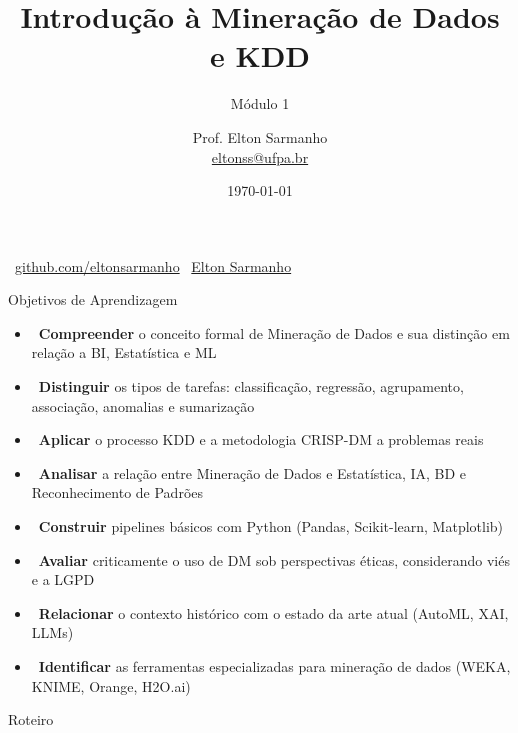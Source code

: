 \documentclass[aspectratio=169]{beamer}
\title[Mineração de Dados]{Introdução à Mineração de Dados e KDD}
\subtitle{Módulo 1}
\author[Elton Sarmanho]{
    Prof. Elton Sarmanho\inst{1}\\
    \footnotesize \href{mailto:eltonss@ufpa.br}{eltonss@ufpa.br}
}
\institute[UFPA]{
    \inst{1} Faculdade de Sistemas de Informação -- UFPA Campus Cametá
}
\date{\today}
\begin{document}
\begin{frame}
    \titlepage
    \begin{center}
        \tiny \faGithub\ \href{https://github.com/eltonsarmanho}{github.com/eltonsarmanho} \quad
        \faLinkedinSquare\ \href{https://www.linkedin.com/in/elton-sarmanho-836553185/}{Elton Sarmanho}
    \end{center}
\end{frame}

\begin{frame}{Objetivos de Aprendizagem}
    \begin{itemize}
        \item \faCheckCircle\ \textbf{Compreender} o conceito formal de Mineração de Dados e sua distinção em relação a BI, Estatística e ML
        \item \faCheckCircle\ \textbf{Distinguir} os tipos de tarefas: classificação, regressão, agrupamento, associação, anomalias e sumarização
        \item \faCheckCircle\ \textbf{Aplicar} o processo KDD e a metodologia CRISP-DM a problemas reais
        \item \faCheckCircle\ \textbf{Analisar} a relação entre Mineração de Dados e Estatística, IA, BD e Reconhecimento de Padrões
        \item \faCheckCircle\ \textbf{Construir} pipelines básicos com Python (Pandas, Scikit-learn, Matplotlib)
        \item \faCheckCircle\ \textbf{Avaliar} criticamente o uso de DM sob perspectivas éticas, considerando viés e a LGPD
        \item \faCheckCircle\ \textbf{Relacionar} o contexto histórico com o estado da arte atual (AutoML, XAI, LLMs)
        \item \faCheckCircle\ \textbf{Identificar} as ferramentas especializadas para mineração de dados (WEKA, KNIME, Orange, H2O.ai)
    \end{itemize}
\end{frame}

\begin{frame}{Roteiro}
    \tableofcontents
\end{frame}
\end{document}

